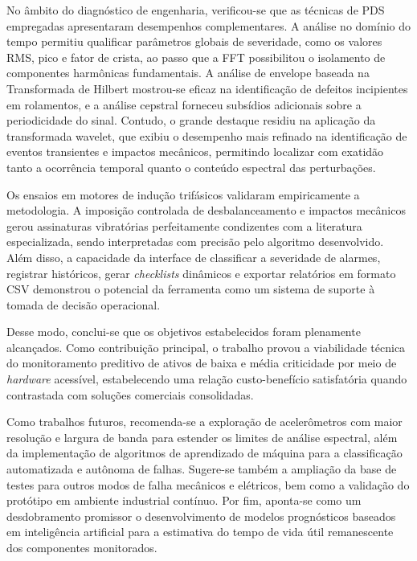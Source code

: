 \documentclass[conference]{IEEEtran}
\begin{document}
No âmbito do diagnóstico de engenharia, verificou-se que as técnicas de PDS empregadas apresentaram desempenhos complementares. A análise no domínio do tempo permitiu qualificar parâmetros globais de severidade, como os valores RMS, pico e fator de crista, ao passo que a FFT possibilitou o isolamento de componentes harmônicas fundamentais. A análise de envelope baseada na Transformada de Hilbert mostrou-se eficaz na identificação de defeitos incipientes em rolamentos, e a análise cepstral forneceu subsídios adicionais sobre a periodicidade do sinal. Contudo, o grande destaque residiu na aplicação da transformada wavelet, que exibiu o desempenho mais refinado na identificação de eventos transientes e impactos mecânicos, permitindo localizar com exatidão tanto a ocorrência temporal quanto o conteúdo espectral das perturbações.

Os ensaios em motores de indução trifásicos validaram empiricamente a metodologia. A imposição controlada de desbalanceamento e impactos mecânicos gerou assinaturas vibratórias perfeitamente condizentes com a literatura especializada, sendo interpretadas com precisão pelo algoritmo desenvolvido. Além disso, a capacidade da interface de classificar a severidade de alarmes, registrar históricos, gerar \textit{checklists} dinâmicos e exportar relatórios em formato CSV demonstrou o potencial da ferramenta como um sistema de suporte à tomada de decisão operacional.

Desse modo, conclui-se que os objetivos estabelecidos foram plenamente alcançados. Como contribuição principal, o trabalho provou a viabilidade técnica do monitoramento preditivo de ativos de baixa e média criticidade por meio de \textit{hardware} acessível, estabelecendo uma relação custo-benefício satisfatória quando contrastada com soluções comerciais consolidadas.

Como trabalhos futuros, recomenda-se a exploração de acelerômetros com maior resolução e largura de banda para estender os limites de análise espectral, além da implementação de algoritmos de aprendizado de máquina para a classificação automatizada e autônoma de falhas. Sugere-se também a ampliação da base de testes para outros modos de falha mecânicos e elétricos, bem como a validação do protótipo em ambiente industrial contínuo. Por fim, aponta-se como um desdobramento promissor o desenvolvimento de modelos prognósticos baseados em inteligência artificial para a estimativa do tempo de vida útil remanescente dos componentes monitorados.



\end{document}
